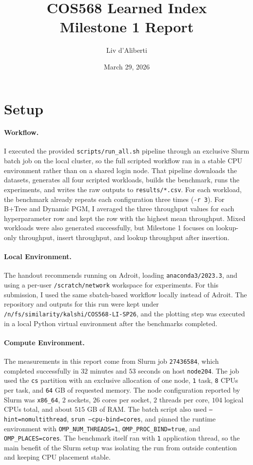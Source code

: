 \documentclass[10pt]{article}
\title{COS568 Learned Index\\Milestone 1 Report}
\author{Liv d'Aliberti}
\date{March 29, 2026}
\begin{document}
\maketitle
\thispagestyle{empty}

\section*{Setup}

\paragraph{Workflow.}
I executed the provided \texttt{scripts/run\_all.sh} pipeline through an exclusive Slurm batch job on the local cluster, so the full scripted workflow ran in a stable CPU environment rather than on a shared login node. That pipeline downloads the datasets, generates all four scripted workloads, builds the benchmark, runs the experiments, and writes the raw outputs to \texttt{results/*.csv}. For each workload, the benchmark already repeats each configuration three times (\texttt{-r 3}). For B+Tree and Dynamic PGM, I averaged the three throughput values for each hyperparameter row and kept the row with the highest mean throughput. Mixed workloads were also generated successfully, but Milestone 1 focuses on lookup-only throughput, insert throughput, and lookup throughput after insertion.

\paragraph{Local Environment.}
The handout recommends running on Adroit, loading \texttt{anaconda3/2023.3}, and using a per-user \texttt{/scratch/network} workspace for experiments. For this submission, I used the same sbatch-based workflow locally instead of Adroit. The repository and outputs for this run were kept under \texttt{/n/fs/similarity/kalshi/COS568-LI-SP26}, and the plotting step was executed in a local Python virtual environment after the benchmarks completed.

\paragraph{Compute Environment.}
The measurements in this report come from Slurm job \texttt{27436584}, which completed successfully in \(32\) minutes and \(53\) seconds on host \texttt{node204}. The job used the \texttt{cs} partition with an exclusive allocation of one node, \texttt{1} task, \texttt{8} CPUs per task, and \texttt{64} GB of requested memory. The node configuration reported by Slurm was \texttt{x86\_64}, \(2\) sockets, \(26\) cores per socket, \(2\) threads per core, \(104\) logical CPUs total, and about \(515\) GB of RAM. The batch script also used \texttt{--hint=nomultithread}, \texttt{srun --cpu-bind=cores}, and pinned the runtime environment with \texttt{OMP\_NUM\_THREADS=1}, \texttt{OMP\_PROC\_BIND=true}, and \texttt{OMP\_PLACES=cores}. The benchmark itself ran with \texttt{1} application thread, so the main benefit of the Slurm setup was isolating the run from outside contention and keeping CPU placement stable.
\end{document}
